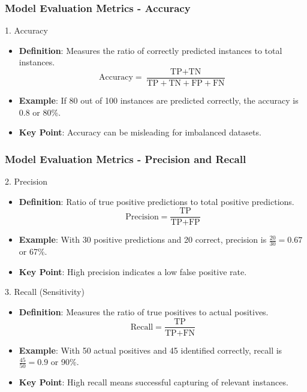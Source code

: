 \documentclass[aspectratio=169]{beamer}
\begin{document}
\begin{frame}[fragile]
    \frametitle{Model Evaluation Metrics - Accuracy}
    \begin{block}{1. Accuracy}
        \begin{itemize}
            \item \textbf{Definition}: Measures the ratio of correctly predicted instances to total instances.
            \[
            \text{Accuracy} = \frac{\text{TP} + \text{TN}}{\text{TP} + \text{TN} + \text{FP} + \text{FN}}
            \]
            \item \textbf{Example}: If 80 out of 100 instances are predicted correctly, the accuracy is \( 0.8 \) or 80\%.
            \item \textbf{Key Point}: Accuracy can be misleading for imbalanced datasets.
        \end{itemize}
    \end{block}
\end{frame}

\begin{frame}[fragile]
    \frametitle{Model Evaluation Metrics - Precision and Recall}
    \begin{block}{2. Precision}
        \begin{itemize}
            \item \textbf{Definition}: Ratio of true positive predictions to total positive predictions.
            \[
            \text{Precision} = \frac{\text{TP}}{\text{TP} + \text{FP}}
            \]
            \item \textbf{Example}: With 30 positive predictions and 20 correct, precision is \( \frac{20}{30} = 0.67 \) or 67\%.
            \item \textbf{Key Point}: High precision indicates a low false positive rate.
        \end{itemize}
    \end{block}
    
    \begin{block}{3. Recall (Sensitivity)}
        \begin{itemize}
            \item \textbf{Definition}: Measures the ratio of true positives to actual positives.
            \[
            \text{Recall} = \frac{\text{TP}}{\text{TP} + \text{FN}}
            \]
            \item \textbf{Example}: With 50 actual positives and 45 identified correctly, recall is \( \frac{45}{50} = 0.9 \) or 90\%.
            \item \textbf{Key Point}: High recall means successful capturing of relevant instances.
        \end{itemize}
    \end{block}
\end{frame}
\end{document}
